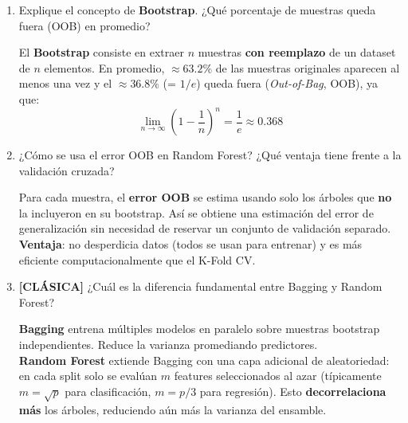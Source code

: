 \documentclass[11pt,a4paper]{article}
\begin{document}
\begin{enumerate}[label=\textbf{P\arabic*.}, resume]

\item Explique el concepto de \textbf{Bootstrap}. ¿Qu\'e porcentaje de muestras queda
  fuera (OOB) en promedio?

\begin{answerbox}
El \textbf{Bootstrap} consiste en extraer $n$ muestras \textbf{con reemplazo} de un
dataset de $n$ elementos. En promedio, $\approx 63.2\%$ de las muestras originales
aparecen al menos una vez y el $\approx 36.8\%$ (= $1/e$) queda fuera (\textit{Out-of-Bag},
OOB), ya que:
\[
  \lim_{n\to\infty}\left(1 - \frac{1}{n}\right)^n = \frac{1}{e} \approx 0.368
\]
\end{answerbox}

\item ¿C\'omo se usa el error OOB en Random Forest? ¿Qu\'e ventaja tiene frente a la
  validaci\'on cruzada?

\begin{answerbox}
Para cada muestra, el \textbf{error OOB} se estima usando solo los \'arboles que
\textbf{no} la incluyeron en su bootstrap. As\'i se obtiene una estimaci\'on del error
de generalizaci\'on sin necesidad de reservar un conjunto de validaci\'on separado.\\[4pt]
\textbf{Ventaja}: no desperdicia datos (todos se usan para entrenar) y es m\'as eficiente
computacionalmente que el K-Fold CV.
\end{answerbox}

\item \leavevmode

\begin{classicbox}
\textcolor{tdred}{\textbf{[CL\'ASICA]}} ¿Cu\'al es la diferencia fundamental entre
Bagging y Random Forest?
\end{classicbox}

\begin{answerbox}
\textbf{Bagging} entrena m\'ultiples modelos en paralelo sobre muestras bootstrap
independientes. Reduce la varianza promediando predictores.\\[4pt]
\textbf{Random Forest} extiende Bagging con una capa adicional de aleatoriedad: en
cada split solo se eval\'uan $m$ features seleccionados al azar (t\'ipicamente
$m = \sqrt{p}$ para clasificaci\'on, $m = p/3$ para regresi\'on). Esto
\textbf{decorrelaciona m\'as} los \'arboles, reduciendo a\'un m\'as la varianza del
ensamble.
\end{answerbox}


\end{enumerate}
\end{document}
